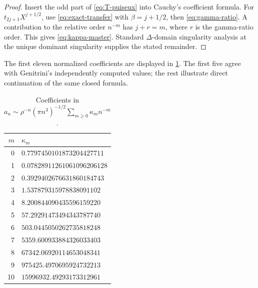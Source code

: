 \documentclass[11pt]{article}
\theoremstyle{definition}
\theoremstyle{remark}
\begin{document}
\begin{proof}
Insert the odd part of \cref{eq:T-puiseux} into Cauchy's coefficient formula.
For $t_{2j+1}X^{j+1/2}$, use \cref{eq:exact-transfer} with
$\beta=j+1/2$, then \cref{eq:gamma-ratio}.  A contribution to the relative
order $n^{-m}$ has $j+r=m$, where $r$ is the gamma-ratio order.  This gives
\cref{eq:kappa-master}.  Standard $\Delta$-domain singularity analysis at the
unique dominant singularity supplies the stated remainder.
\end{proof}

The first eleven normalized coefficients are displayed in
\cref{tab:kappa}.  The first five agree with Genitrini's independently
computed values; the rest illustrate direct continuation of the same closed
formula.

\begin{table}[htbp]
\centering
\caption{Coefficients in
$a_n\sim\rho^{-n}(\pi n^3)^{-1/2}\sum_{m\geq0}\kappa_mn^{-m}$.}
\label{tab:kappa}
\small
\begin{tabular}{r@{\qquad}l}
\toprule
$m$ & $\kappa_m$\\
\midrule
0  & $0.7797450101873204427711$\\
1  & $0.07828911261061096206128$\\
2  & $0.3929402676631860184743$\\
3  & $1.537879315978838091102$\\
4  & $8.200844090435596159220$\\
5  & $57.29291473494343787740$\\
6  & $503.0445050262735818248$\\
7  & $5359.600933884326033403$\\
8  & $67342.06920114653048341$\\
9  & $975425.4970695924732213$\\
10 & $15996932.49293173312961$\\
\bottomrule
\end{tabular}
\end{table}
\end{document}

